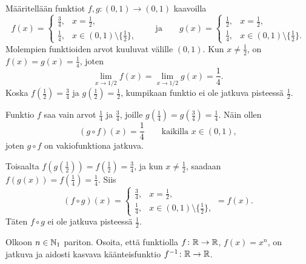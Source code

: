\documentclass[11pt,a4paper]{amsart}
\begin{document}
\begin{solution}
  Määritellään funktiot \(f, g \colon (0, 1) \to (0, 1)\) kaavoilla
  \[
    f(x) =
    \begin{cases}
      \frac{3}{4}, & x = \frac{1}{2}, \\
      \frac{1}{4}, & x \in (0, 1) \setminus \{\frac{1}{2}\},
    \end{cases}
    \qquad \text{ja} \qquad
    g(x) =
    \begin{cases}
      \frac{1}{2}, & x = \frac{1}{2}, \\
      \frac{1}{4}, & x \in (0, 1) \setminus \{\frac{1}{2}\}.
    \end{cases}
  \]
  Molempien funktioiden arvot kuuluvat välille \((0, 1)\).
  Kun \(x \ne \frac{1}{2}\), on \(f(x) = g(x) = \frac{1}{4}\), joten
  \[
    \lim_{x \to 1/2} f(x) = \lim_{x \to 1/2} g(x) = \frac{1}{4}.
  \]
  Koska \(f\left(\frac{1}{2}\right) = \frac{3}{4}\) ja
  \(g\left(\frac{1}{2}\right) = \frac{1}{2}\), kumpikaan funktio ei ole jatkuva
  pisteessä \(\frac{1}{2}\).

  Funktio \(f\) saa vain arvot \(\frac{1}{4}\) ja \(\frac{3}{4}\), joille
  \(g\left(\frac{1}{4}\right) = g\left(\frac{3}{4}\right) =
  \frac{1}{4}\). Näin ollen
  \[
    (g \circ f)(x) = \frac{1}{4}
    \qquad \text{kaikilla } x \in (0, 1),
  \]
  joten \(g \circ f\) on vakiofunktiona jatkuva.

  Toisaalta \(f(g\left(\frac{1}{2}\right)) = f\left(\frac{1}{2}\right) =
  \frac{3}{4}\), ja kun
  \(x \ne \frac{1}{2}\), saadaan
  \(f(g(x)) = f\left(\frac{1}{4}\right) = \frac{1}{4}\). Siis
  \[
    (f \circ g)(x) =
    \begin{cases}
      \frac{3}{4}, & x = \frac{1}{2}, \\
      \frac{1}{4}, & x \in (0, 1) \setminus \{\frac{1}{2}\},
    \end{cases}
    = f(x).
  \]
  Täten \(f \circ g\) ei ole jatkuva pisteessä \(\frac{1}{2}\).
\end{solution}

\begin{exercise}
  Olkoon \(n \in \mathbb{N}_1\) pariton. Osoita, että funktiolla
  \(f \colon \mathbb{R} \to \mathbb{R}\), \(f(x) = x^n\), on jatkuva ja aidosti kasvava
  käänteisfunktio \(f^{-1} \colon \mathbb{R} \to \mathbb{R}\).
\end{exercise}
\end{document}
